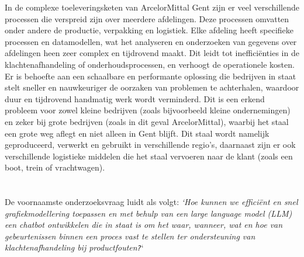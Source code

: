 In de complexe toeleveringsketen van ArcelorMittal Gent zijn er veel verschillende processen die verspreid zijn over meerdere afdelingen. 
Deze processen omvatten onder andere de productie, verpakking en logistiek.
Elke afdeling heeft specifieke processen en datamodellen, wat het analyseren en onderzoeken van gegevens over afdelingen heen zeer complex en tijdrovend maakt. 
Dit leidt tot inefficiënties in de klachtenafhandeling of onderhoudsprocessen, en verhoogt de operationele kosten. 
Er is behoefte aan een schaalbare en performante oplossing die bedrijven in staat stelt sneller en nauwkeuriger de oorzaken van problemen te achterhalen, waardoor duur en tijdrovend handmatig werk wordt verminderd.
Dit is een erkend probleem voor zowel kleine bedrijven (zoals bijvoorbeeld kleine ondernemingen) en zeker bij grote bedrijven (zoals in dit geval ArcelorMittal), waarbij het staal een grote weg aflegt en niet alleen in Gent blijft.
Dit staal wordt namelijk geproduceerd, verwerkt en gebruikt in verschillende regio's, daarnaast zijn er ook verschillende logistieke middelen die het staal vervoeren naar de klant (zoals een boot, trein of vrachtwagen).
\section{}%
\label{sec:onderzoeksvraag}

De voornaamste onderzoeksvraag luidt als volgt: \emph{`Hoe kunnen we efficiënt en snel grafiekmodellering toepassen en met behulp van een large language model (LLM) een chatbot ontwikkelen die in staat is om het waar, wanneer, wat en hoe van gebeurtenissen binnen een proces vast te stellen ter ondersteuning van klachtenafhandeling bij productfouten\texttt{?}}`

